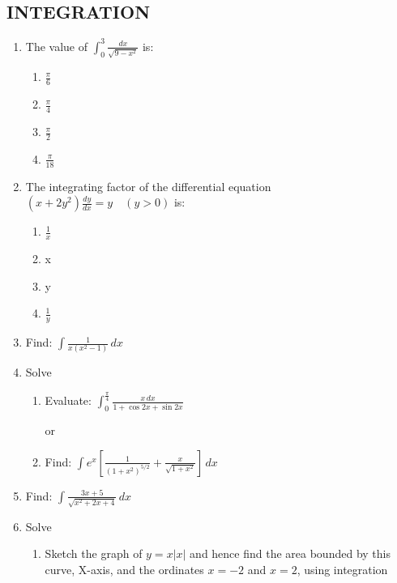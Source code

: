 \documentclass{article}
\begin{document}
\subsection*{INTEGRATION}

\begin{enumerate}[label=\textbf{\arabic*.}] %

    \item The value of \(\int_{0}^{3} \frac{dx}{\sqrt{9 - x^2}}\) is:
    \begin{enumerate}[label=\alph*)] %
      \item \(\frac{\pi}{6}\)
      \item \(\frac{\pi}{4}\)
      \item \(\frac{\pi}{2}\)
      \item \(\frac{\pi}{18}\)
    \end{enumerate}

    \item The integrating factor of the differential equation \((x + 2y^2) \frac{dy}{dx} = y \quad (y > 0)\) is:
    \begin{enumerate}[label=\alph*)] %
      \item \(\frac{1}{x}\)
      \item x
      \item y
      \item \(\frac{1}{y}\)
    \end{enumerate}

    \item Find: \(\int \frac{1}{x(x^2 - 1)} \, dx\)

    \item Solve
    \begin{enumerate}[label=\alph*)] %
        \item Evaluate: \(\int_{0}^{\frac{\pi}{4}} \frac{x \, dx}{1 + \cos 2x + \sin 2x}\)
        
        or
        
        \item Find: \(\int e^x \left[ \frac{1}{(1 + x^2)^{5/2}} + \frac{x}{\sqrt{1 + x^2}} \right] \, dx\)
    \end{enumerate}

    \item Find: \(\int \frac{3x + 5}{\sqrt{x^2 + 2x + 4}} \, dx\)

    
        \item Solve
    \begin{enumerate}[label=\alph*)] %
        \item Sketch the graph of \( y = x \left| x \right| \) and hence find the area bounded by this curve, X-axis, and the ordinates \( x = -2 \) and \( x = 2 \), using integration
        

\end{enumerate}
\end{enumerate}
\end{document}
